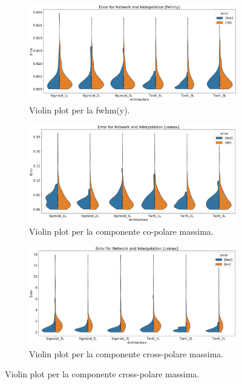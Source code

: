 \documentclass[12pt,a4paper,final]{book}
\begin{document}
\begin{figure}[!ht]\ContinuedFloat
	\begin{subfigure}{\textwidth}
		\centering
		\includegraphics[width=\linewidth]{../figures/violin_plot_fwhmy.png}
		\caption{Violin plot per la fwhm(y).}
		\label{violin_fwhmy}
	\end{subfigure}
	\newline
	\begin{subfigure}{\textwidth}
	    \centering
	    \includegraphics[width=\linewidth]{../figures/violin_plot_comax.png}
	    \caption{Violin plot per la componente co-polare massima.}
	    \label{violin_comax}
	\end{subfigure}
	\newline
	\begin{subfigure}{\textwidth}
		\centering
	    \includegraphics[width=\linewidth]{../figures/violin_plot_cxmax.png}
	    \caption{Violin plot per la componente cross-polare massima.}
	    \label{violin_cxmax}
	\end{subfigure}
\end{figure}
\newpage
\end{document}

